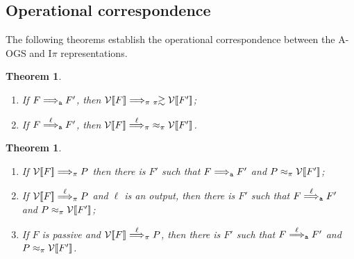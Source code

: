 \documentclass[11pt,a4paper]{amsart}
\theoremstyle{plain}
\theoremstyle{definition}
\theoremstyle{defC}
\theoremstyle{thmC}
\theoremstyle{plain}
\numberwithin{equation}{section}
\newcommand{\AOGS}{\mbox{{\rm A-OGS}}\xspace}      %
\newcommand{\rmm}[1]{{\tt{\lowercase{#1}}}}
\newcommand{\genArr}[2]{\mathrel{\stackrel{{#1}}{\Longrightarrow}_{\rmm{\lowercase{#2}}}}}  %
\newcommand{\genLongrightarrow}[1]{\mathrel{\Longrightarrow_{\rmm{\lowercase{#1}}}}}
\newcommand{\ArrPI}[1]{\genArr{#1}{\pi}}   %
\newcommand{\LongrightarrowPI}{\genLongrightarrow{\pi}}
\newcommand{\ArrA}[1]{\genArr{#1}{A}}  %
\newcommand{\LongrightarrowA}{\genLongrightarrow{A}}
\newcommand{\genwb}[1]{\mathrel{\approx_{\rmm{\lowercase{#1}}}}}       %
\newcommand{\wbPI}{\genwb{\pi}}       %
\newcommand{\contr}{\mathrel{\mbox{}_{\pi}\!\!\gtrsim}}
\newcommand{\FF}{F}
\newcommand{\PP}{P}
\newcommand{\cbvSymb}{{\mathcal {V}}}
\newcommand{\encoEnvI}[1]{ \cbvSymb[\! [ #1 ] \! ]  } %
\newcommand{\encoConI}{\encoEnvI} %
\newcommand{\Intp}{\mbox{I$\pi$}\xspace}   %
\newcommand{\piI}{\Intp}   %
\theoremstyle{plain}
\newtheorem{theorem}[thm]{Theorem}
\theoremstyle{definition}
\begin{document}
\subsection{Operational correspondence}
\label{s:OC}

The following theorems establish the operational correspondence between the \AOGS and \piI representations. 


\begin{theorem} %
\label{t:opcorrCON_w}
$ $ \begin{enumerate}

\item If $\FF \LongrightarrowA \FF'$, then 
$\encoConI \FF \LongrightarrowPI  \; \contr \encoConI {\FF'}$;


\item If $\FF \ArrA\ell \FF'$, then
$ \encoConI \FF \ArrPI\ell  
\; \wbPI
\encoConI {\FF'}$.
\end{enumerate} 
\end{theorem} 





\begin{theorem} %
\label{t:opcorrCON2_w}
$ $ \begin{enumerate}


\item If 
$ \encoConI \FF \LongrightarrowPI \PP$ then there is $\FF'$ such that 
$\FF \LongrightarrowA \FF'$  and  
$\PP  \wbPI \encoConI {\FF'}$; 


\item If
$ \encoConI \FF \ArrPI\ell \PP$
and  $\ell$ is an output, 
 then there is $\FF'$ such that
 $\FF \ArrA\ell \FF'$
and $\PP \wbPI  \encoConI {\FF'}$;


\item If  $\FF$ is passive and 
$ \encoConI \FF \ArrPI{\ell} \PP$, 
then 
 there is $\FF'$ such that 
$\FF \ArrA{\ell} \FF'$
and $\PP  \wbPI \encoConI {\FF'}$.
\end{enumerate} 
\end{theorem} 
\end{document}
